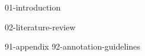 \documentclass[a4paper,oneside,10pt,ngerman,english]{scrbook}
\begin{document}

\mainmatter


{01-introduction}

{02-literature-review}



\cleardoubleoddpage
\printbibliography

\appendix


{91-appendix}
{92-annotation-guidelines}


\cleardoubleoddpage
\end{document}
